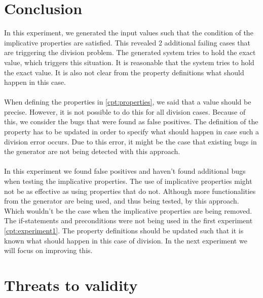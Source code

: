 \section{Conclusion}
In this experiment, we generated the input values such that the condition of
the implicative properties are satisfied. This revealed 2 additional
failing cases that are triggering the division problem. The generated system
tries to hold the exact value, which triggers this situation. It is reasonable
that the system tries to hold the exact value. It is also not clear from the
property definitions what should happen in this case.\\
\\
When defining the properties in \autoref{cpt:properties}, we said that a value
should be precise. However, it is not possible to do this for all division
cases. Because of this, we consider the bugs that were found as false positives.
The definition of the property has to be updated in order to specify what should
happen in case such a division error occurs. Due to this error, it might be the
case that existing bugs in the generator are not being detected with this
approach.\\
\\
In this experiment we found false positives and haven't found additional bugs when testing the implicative properties.
The use of implicative properties might not be as effective as using properties
that do not. Although more functionalities from the generator are
being used, and thus being tested, by this approach. Which wouldn't be the case
when the implicative properties are being removed. The if-statements and
preconditions were not being used in the first experiment \autoref{cpt:experiment1}.
The property definitions should be updated such that it is known what should
happen in this case of division. In the next experiment we will focus on improving this.

\section{Threats to validity}

